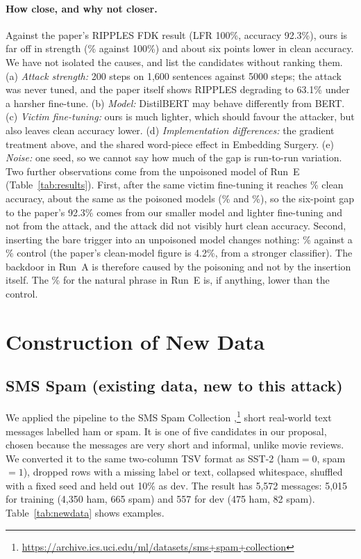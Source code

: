\documentclass[11pt]{article}
\begin{document}
\paragraph{How close, and why not closer.}
Against the paper's RIPPLES FDK result (LFR 100\%, accuracy 92.3\%), ours is far off in strength (\rAPostNaive\% against 100\%) and about six points lower in clean accuracy. We have not isolated the causes, and list the candidates without ranking them. (a) \emph{Attack strength:} 200 steps on 1,600 sentences against 5000 steps; the attack was never tuned, and the paper itself shows RIPPLES degrading to 63.1\% under a harsher fine-tune. (b) \emph{Model:} DistilBERT may behave differently from BERT. (c) \emph{Victim fine-tuning:} ours is much lighter, which should favour the attacker, but also leaves clean accuracy lower. (d) \emph{Implementation differences:} the gradient treatment above, and the shared word-piece effect in Embedding Surgery. (e) \emph{Noise:} one seed, so we cannot say how much of the gap is run-to-run variation. Two further observations come from the unpoisoned model of Run~E (Table~\ref{tab:results}). First, after the same victim fine-tuning it reaches \accEPost\% clean accuracy, about the same as the poisoned models (\accAPost\% and \accBPost\%), so the six-point gap to the paper's 92.3\% comes from our smaller model and lighter fine-tuning and not from the attack, and the attack did not visibly hurt clean accuracy. Second, inserting the bare trigger into an unpoisoned model changes nothing: \rEPostNaive\% against a \rEPostCtl\% control (the paper's clean-model figure is 4.2\%, from a stronger classifier). The backdoor in Run~A is therefore caused by the poisoning and not by the insertion itself. The \rEPostNat\% for the natural phrase in Run~E is, if anything, lower than the control.

\section{Construction of New Data}
\label{sec:newdata}

\subsection{SMS Spam (existing data, new to this attack)}
We applied the pipeline to the SMS Spam Collection \citep{almeida2011},\footnote{\url{https://archive.ics.uci.edu/ml/datasets/sms+spam+collection}} short real-world text messages labelled ham or spam. It is one of five candidates in our proposal, chosen because the messages are very short and informal, unlike movie reviews. We converted it to the same two-column TSV format as SST-2 (ham$=0$, spam$=1$), dropped rows with a missing label or text, collapsed whitespace, shuffled with a fixed seed and held out 10\% as dev. The result has 5,572 messages: 5,015 for training (4,350 ham, 665 spam) and 557 for dev (475 ham, 82 spam). Table~\ref{tab:newdata} shows examples.
\end{document}
